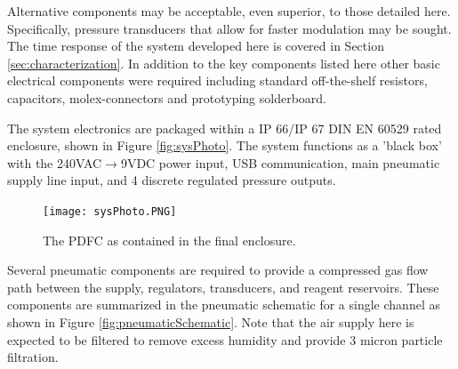 Alternative components may be acceptable, even superior, to those detailed here. Specifically, pressure transducers that allow for faster modulation may be sought. The time response of the system developed here is covered in Section \ref{sec:characterization}. In addition to the key components listed here other basic electrical components were required including standard off-the-shelf resistors, capacitors, molex-connectors and prototyping solderboard.

The system electronics are packaged within a IP 66/IP 67 DIN EN 60529 rated enclosure, shown in Figure \vref{fig:sysPhoto}. The system functions as a 'black box' with the 240VAC$ \to $9VDC power input, USB communication, main pneumatic supply line input, and 4 discrete regulated pressure outputs.

\begin{figure}[H]
\centering 
\texttt{[image: sysPhoto.PNG]} 
\caption[Image of Packaged PDFC]{The PDFC as contained in the final enclosure.} 
\label{fig:sysPhoto} 
\end{figure}

Several pneumatic components are required to provide a compressed gas flow path between the supply, regulators, transducers, and reagent reservoirs. These components are summarized in the pneumatic schematic for a single channel as shown in Figure \vref{fig:pneumaticSchematic}. Note that the air supply here is expected to be filtered to remove excess humidity and provide 3 micron particle filtration. 

